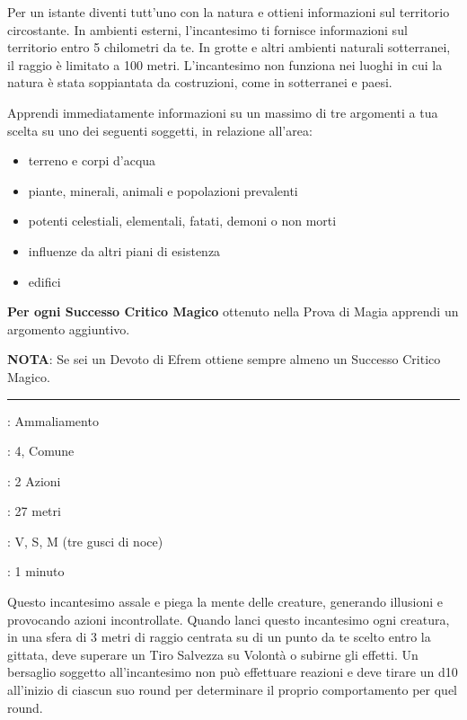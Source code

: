\begin{multicols}{2}
Per un istante diventi tutt'uno con la natura e ottieni informazioni sul territorio circostante. In ambienti esterni, l'incantesimo ti fornisce informazioni sul territorio entro 5 chilometri da te. In grotte e altri ambienti naturali sotterranei, il raggio è limitato a 100 metri. L'incantesimo non funziona nei luoghi in cui la natura è stata soppiantata da costruzioni, come in sotterranei e paesi.

Apprendi immediatamente informazioni su un massimo di tre argomenti a tua scelta su uno dei seguenti soggetti, in relazione all'area:

\begin{itemize}\setlength{\itemsep}{-1pt}
	\item terreno e corpi d'acqua
	\item piante, minerali, animali e popolazioni prevalenti
	\item potenti celestiali, elementali, fatati, demoni o non morti
	\item influenze da altri piani di esistenza
	\item edifici
\end{itemize}


\textbf{Per ogni Successo Critico Magico} ottenuto nella Prova di Magia apprendi un argomento aggiuntivo.

\textbf{NOTA}: Se sei un Devoto di Efrem ottiene sempre almeno un Successo Critico Magico.

\smallskip\noindent\rule{\linewidth}{2pt} \hypertarget{Confusione}{}\medskip{}\hypertarget{incconfusione}{}\label{incconfusione}
\noindent
\begin{description}[noitemsep, topsep=0pt, parsep=0pt, partopsep=0pt, leftmargin=0cm, labelwidth=2.8cm]
	\item[\textbf{Lista di Magia}]: Ammaliamento
	\item[\textbf{Livello}]: 4, Comune
	\item[\textbf{T. di Lancio}]: 2 Azioni
	\item[\textbf{Gittata}]: 27 metri
	\item[\textbf{Componenti}]: V, S, M (tre gusci di noce)
	\item[\textbf{Durata}]: 1 minuto
\end{description}

Questo incantesimo assale e piega la mente delle creature, generando illusioni e provocando azioni incontrollate. Quando lanci questo incantesimo ogni creatura, in una sfera di 3 metri di raggio centrata su di un punto da te scelto entro la gittata, deve superare un Tiro Salvezza su Volontà o subirne gli effetti. Un bersaglio soggetto all'incantesimo non può effettuare reazioni e deve tirare un d10 all'inizio di ciascun suo round per determinare il proprio comportamento per quel round.


\end{multicols}
